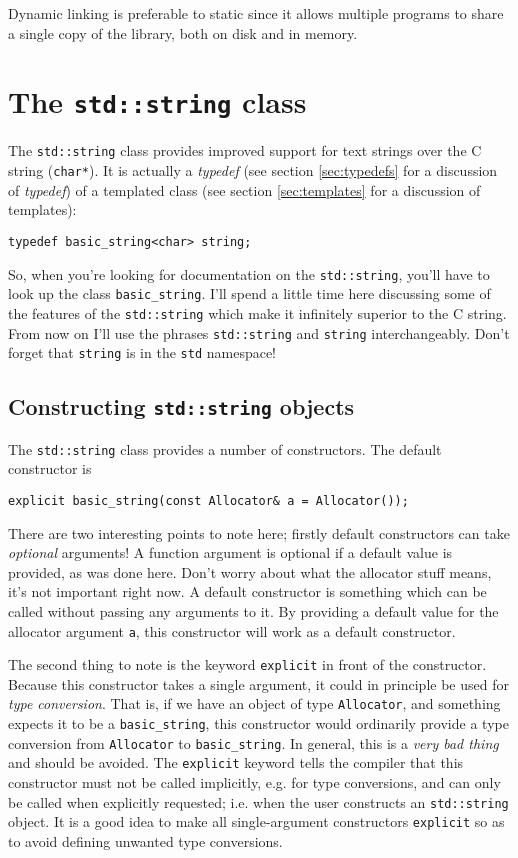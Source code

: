 \documentclass[a4paper]{scrartcl}
\begin{document}
Dynamic linking is preferable to static since it allows multiple programs to share a single copy of the library, both on disk and in memory.

\section{The \texttt{std::string} class}\label{sec:string}
The \texttt{std::string} class provides improved support for text strings over the C string (\texttt{char*}). It is actually a \emph{typedef} (see section \ref{sec:typedefs} for a discussion of \emph{typedef}) of a templated class (see section \ref{sec:templates} for a discussion of templates):
\begin{verbatim}
typedef basic_string<char> string;
\end{verbatim}

So, when you're looking for documentation on the \texttt{std::string}, you'll have to look up the class \texttt{basic\_string}. I'll spend a little time here discussing some of the features of the \texttt{std::string} which make it infinitely superior to the C string. From now on I'll use the phrases \texttt{std::string} and \texttt{string} interchangeably. Don't forget that \texttt{string} is in the \texttt{std} namespace!

\subsection{Constructing \texttt{std::string} objects}
The \texttt{std::string} class provides a number of constructors. The default constructor is
\begin{verbatim}
explicit basic_string(const Allocator& a = Allocator());
\end{verbatim}
There are two interesting points to note here; firstly default constructors can take \emph{optional} arguments! A function argument is optional if a default value is provided, as was done here. Don't worry about what the allocator stuff means, it's not important right now. A default constructor is something which can be called without passing any arguments to it. By providing a default value for the allocator argument \texttt{a}, this constructor will work as a default constructor.

The second thing to note is the keyword \texttt{explicit} in front of the constructor. Because this constructor takes a single argument, it could in principle be used for \emph{type conversion}. That is, if we have an object of type \texttt{Allocator}, and something expects it to be a \texttt{basic\_string}, this constructor would ordinarily provide a type conversion from \texttt{Allocator} to \texttt{basic\_string}. In general, this is a \emph{very bad thing} and should be avoided. The \texttt{explicit} keyword tells the compiler that this constructor must not be called implicitly, e.g. for type conversions, and can only be called when explicitly requested; i.e. when the user constructs an \texttt{std::string} object. It is a good idea to make all single-argument constructors \texttt{explicit} so as to avoid defining unwanted type conversions.
\end{document}
